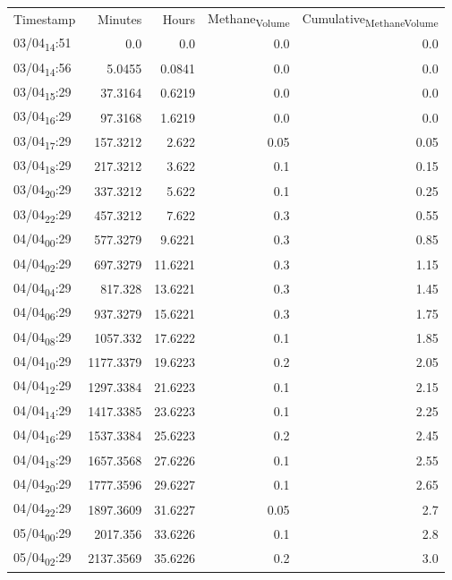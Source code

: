 \documentclass[11pt]{article}
\begin{document}
\begin{center}
\begin{tabular}{lrrrr}
Timestamp & Minutes & Hours & Methane\textsubscript{Volume} & Cumulative\textsubscript{Methane}\textsubscript{Volume}\\[0pt]
03/04\textsubscript{14}:51 & 0.0 & 0.0 & 0.0 & 0.0\\[0pt]
03/04\textsubscript{14}:56 & 5.0455 & 0.0841 & 0.0 & 0.0\\[0pt]
03/04\textsubscript{15}:29 & 37.3164 & 0.6219 & 0.0 & 0.0\\[0pt]
03/04\textsubscript{16}:29 & 97.3168 & 1.6219 & 0.0 & 0.0\\[0pt]
03/04\textsubscript{17}:29 & 157.3212 & 2.622 & 0.05 & 0.05\\[0pt]
03/04\textsubscript{18}:29 & 217.3212 & 3.622 & 0.1 & 0.15\\[0pt]
03/04\textsubscript{20}:29 & 337.3212 & 5.622 & 0.1 & 0.25\\[0pt]
03/04\textsubscript{22}:29 & 457.3212 & 7.622 & 0.3 & 0.55\\[0pt]
04/04\textsubscript{00}:29 & 577.3279 & 9.6221 & 0.3 & 0.85\\[0pt]
04/04\textsubscript{02}:29 & 697.3279 & 11.6221 & 0.3 & 1.15\\[0pt]
04/04\textsubscript{04}:29 & 817.328 & 13.6221 & 0.3 & 1.45\\[0pt]
04/04\textsubscript{06}:29 & 937.3279 & 15.6221 & 0.3 & 1.75\\[0pt]
04/04\textsubscript{08}:29 & 1057.332 & 17.6222 & 0.1 & 1.85\\[0pt]
04/04\textsubscript{10}:29 & 1177.3379 & 19.6223 & 0.2 & 2.05\\[0pt]
04/04\textsubscript{12}:29 & 1297.3384 & 21.6223 & 0.1 & 2.15\\[0pt]
04/04\textsubscript{14}:29 & 1417.3385 & 23.6223 & 0.1 & 2.25\\[0pt]
04/04\textsubscript{16}:29 & 1537.3384 & 25.6223 & 0.2 & 2.45\\[0pt]
04/04\textsubscript{18}:29 & 1657.3568 & 27.6226 & 0.1 & 2.55\\[0pt]
04/04\textsubscript{20}:29 & 1777.3596 & 29.6227 & 0.1 & 2.65\\[0pt]
04/04\textsubscript{22}:29 & 1897.3609 & 31.6227 & 0.05 & 2.7\\[0pt]
05/04\textsubscript{00}:29 & 2017.356 & 33.6226 & 0.1 & 2.8\\[0pt]
05/04\textsubscript{02}:29 & 2137.3569 & 35.6226 & 0.2 & 3.0\\[0pt]

\end{tabular}
\end{center}
\end{document}
